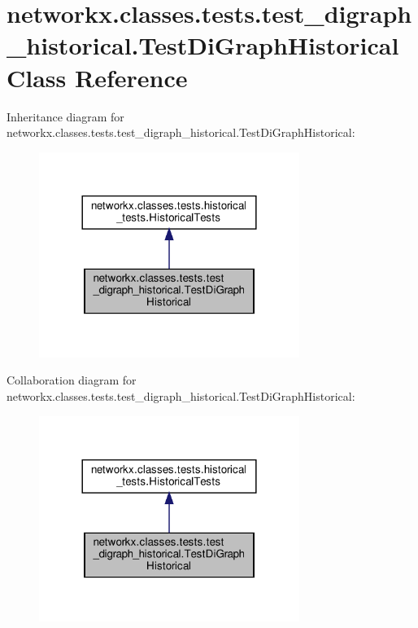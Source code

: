 \hypertarget{classnetworkx_1_1classes_1_1tests_1_1test__digraph__historical_1_1TestDiGraphHistorical}{}\section{networkx.\+classes.\+tests.\+test\+\_\+digraph\+\_\+historical.\+Test\+Di\+Graph\+Historical Class Reference}
\label{classnetworkx_1_1classes_1_1tests_1_1test__digraph__historical_1_1TestDiGraphHistorical}


Inheritance diagram for networkx.\+classes.\+tests.\+test\+\_\+digraph\+\_\+historical.\+Test\+Di\+Graph\+Historical\+:
\nopagebreak
\begin{figure}[H]
\begin{center}
\leavevmode
\includegraphics[width=240pt]{classnetworkx_1_1classes_1_1tests_1_1test__digraph__historical_1_1TestDiGraphHistorical__inherit__graph}
\end{center}
\end{figure}


Collaboration diagram for networkx.\+classes.\+tests.\+test\+\_\+digraph\+\_\+historical.\+Test\+Di\+Graph\+Historical\+:
\nopagebreak
\begin{figure}[H]
\begin{center}
\leavevmode
\includegraphics[width=240pt]{classnetworkx_1_1classes_1_1tests_1_1test__digraph__historical_1_1TestDiGraphHistorical__coll__graph}
\end{center}
\end{figure}
